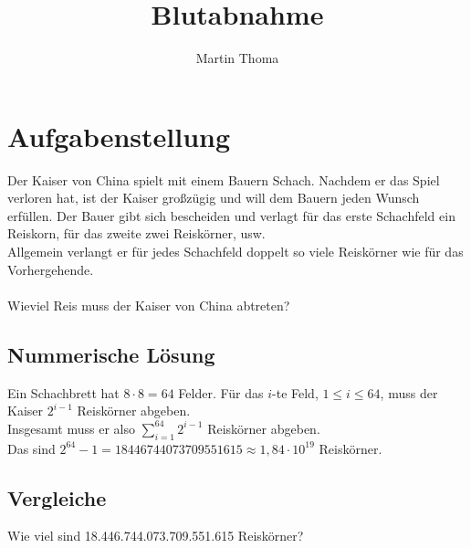 \documentclass[a4paper,9pt]{scrartcl}
\begin{document}
 \title{Blutabnahme}
 \author{Martin Thoma}

 \setcounter{section}{1}
 \section*{Aufgabenstellung}
    Der Kaiser von China spielt mit einem Bauern Schach. Nachdem er das Spiel 
    verloren hat, ist der Kaiser großzügig und will dem Bauern jeden Wunsch 
    erfüllen. Der Bauer gibt sich bescheiden und verlagt für das erste 
    Schachfeld ein Reiskorn, für das zweite zwei Reiskörner, usw. \\
    Allgemein verlangt er für jedes Schachfeld doppelt so viele Reiskörner
    wie für das Vorhergehende.\\
    \\
    Wieviel Reis muss der Kaiser von China abtreten?
 \subsection*{Nummerische Lösung}
    Ein Schachbrett hat $8 \cdot 8 = 64$ Felder. Für das $i$-te Feld, 
    $1 \le i \le 64$, muss der Kaiser $2^{i-1}$ Reiskörner abgeben. \\
    Insgesamt muss er also $\sum_{i=1}^{64} 2^{i-1}$ Reiskörner abgeben.\\
    Das sind 
    $2^{64} - 1 = 18446744073709551615 \approx 1{,}84 \cdot 10^{19} $ 
    Reiskörner. 
 \subsection*{Vergleiche}
    Wie viel sind 18.446.744.073.709.551.615 Reiskörner?\\
\end{document}
